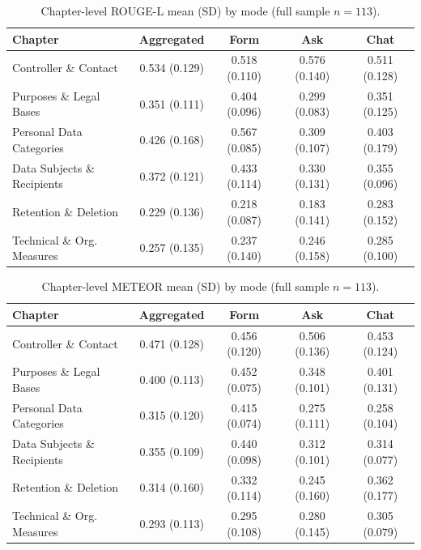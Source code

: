 \begin{table}[htbp]
\centering
\caption{Chapter-level ROUGE-L mean (SD) by mode (full sample
$n = 113$).}
\label{tab:nlp-chapter-rougeL}
\small
\begin{tabular}{@{}l c c c c@{}}
\toprule
Chapter & Aggregated & Form & Ask & Chat \\
\midrule
Controller \& Contact         & 0.534 (0.129) & 0.518 (0.110) & 0.576 (0.140) & 0.511 (0.128) \\
Purposes \& Legal Bases       & 0.351 (0.111) & 0.404 (0.096) & 0.299 (0.083) & 0.351 (0.125) \\
Personal Data Categories      & 0.426 (0.168) & 0.567 (0.085) & 0.309 (0.107) & 0.403 (0.179) \\
Data Subjects \& Recipients   & 0.372 (0.121) & 0.433 (0.114) & 0.330 (0.131) & 0.355 (0.096) \\
Retention \& Deletion         & 0.229 (0.136) & 0.218 (0.087) & 0.183 (0.141) & 0.283 (0.152) \\
Technical \& Org. Measures    & 0.257 (0.135) & 0.237 (0.140) & 0.246 (0.158) & 0.285 (0.100) \\
\bottomrule
\end{tabular}
\end{table}

\begin{table}[htbp]
\centering
\caption{Chapter-level METEOR mean (SD) by mode (full sample
$n = 113$).}
\label{tab:nlp-chapter-meteor}
\small
\begin{tabular}{@{}l c c c c@{}}
\toprule
Chapter & Aggregated & Form & Ask & Chat \\
\midrule
Controller \& Contact         & 0.471 (0.128) & 0.456 (0.120) & 0.506 (0.136) & 0.453 (0.124) \\
Purposes \& Legal Bases       & 0.400 (0.113) & 0.452 (0.075) & 0.348 (0.101) & 0.401 (0.131) \\
Personal Data Categories      & 0.315 (0.120) & 0.415 (0.074) & 0.275 (0.111) & 0.258 (0.104) \\
Data Subjects \& Recipients   & 0.355 (0.109) & 0.440 (0.098) & 0.312 (0.101) & 0.314 (0.077) \\
Retention \& Deletion         & 0.314 (0.160) & 0.332 (0.114) & 0.245 (0.160) & 0.362 (0.177) \\
Technical \& Org. Measures    & 0.293 (0.113) & 0.295 (0.108) & 0.280 (0.145) & 0.305 (0.079) \\
\bottomrule
\end{tabular}
\end{table}

